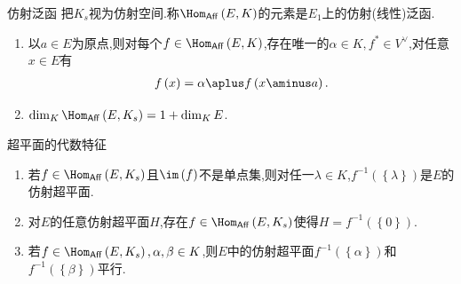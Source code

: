 \begin{definition}{仿射泛函}{}
	把$K_{s}$视为仿射空间.称$\Hom_{\mathsf{Aff}}\left(E,K\right)$的元素是$E_{1}$上的仿射(线性)泛函.
\end{definition}

\begin{proposition}{}{}
	\begin{enumerate}
		\item 以$a\in E$为原点,则对每个$f\in\Hom_{\mathsf{Aff}}\left(E,K\right)$,存在唯一的$\alpha\in K,f^{\ast}\in V^{\vee}$,对任意$x\in E$有
		\begin{align*}
			f\left(x\right)=\alpha\aplus f\left(x\aminus a\right).
		\end{align*}
		\item $\dim_{K}\Hom_{\mathsf{Aff}}\left(E,K_{s}\right)=1+\dim_{K}E$.
	\end{enumerate}
\end{proposition}

\begin{proposition}{超平面的代数特征}{}
	\begin{enumerate}
		\item 若$f\in\Hom_{\mathsf{Aff}}\left(E,K_{s}\right)$且$\im\left(f\right)$不是单点集,则对任一$\lambda\in K$,$f^{-1}\left(\left\{\lambda\right\}\right)$是$E$的仿射超平面.
		\item 对$E$的任意仿射超平面$H$,存在$f\in\Hom_{\mathsf{Aff}}\left(E,K_{s}\right)$使得$H=f^{-1}\left(\left\{0\right\}\right)$.
		\item 若$f\in\Hom_{\mathsf{Aff}}\left(E,K_{s}\right),\alpha,\beta\in K$,则$E$中的仿射超平面$f^{-1}\left(\left\{\alpha\right\}\right)$和$f^{-1}\left(\left\{\beta\right\}\right)$平行.
	\end{enumerate}
\end{proposition}


































